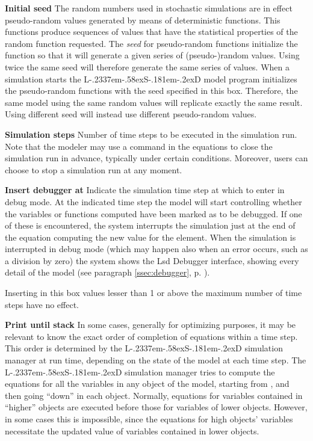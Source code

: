 \documentclass [11pt,a4paper] {book}
\def\LsD{{L\kern-.2337em\lower-.58ex\hbox{S}\kern-.181em\lower-.2ex\hbox{D}}\xspace}
\begin{document}
\textbf{Initial seed} 
The random numbers used in stochastic simulations are in effect pseudo-random values generated by means of deterministic functions. This functions produce sequences of values that have the statistical properties of the random function requested. The \textit{seed} for pseudo-random functions initialize the function so that it will generate a given series of (pseudo-)random values. Using twice the same seed will therefore generate the same series of values. When a simulation starts the \LsD model program initializes the pseudo-random functions with the seed specified in this box. Therefore, the same model using the same random values will replicate exactly the same result. Using different seed will instead use different pseudo-random values.

\bigskip

\textbf{Simulation steps} 
Number of time steps to be executed in the simulation run. Note that the modeler may use a command in the equations to close the simulation run in advance, typically under certain conditions. Moreover, users can choose to stop a simulation run at any moment.

\bigskip


\textbf{Insert debugger at} 
Indicate the simulation time step at which to enter in debug mode. At the indicated time step the model will start controlling whether the variables or functions computed have been marked as to be debugged. If one of these is encountered, the system interrupts the simulation just at the end of the equation computing the new value for the element. When the simulation is interrupted in debug mode (which may happen also when an error occurs, such as a division by zero) the system shows the Lsd Debugger interface, showing every detail of the model (see paragraph \ref{ssec:debugger}, p. \pageref{ssec:debugger}).

Inserting in this box values lesser than 1 or above the maximum number of time steps have no effect.


\bigskip

\textbf{Print until stack} 
In some cases, generally for optimizing purposes, it may be relevant to know the exact order of completion of equations within a time step. This order is determined by the \LsD simulation manager at run time, depending on the state of the model at each time step. The \LsD simulation manager tries to compute the equations for all the variables in any object of the model, starting from , and then going ``down'' in each object. Normally, equations for variables contained in ``higher'' objects are executed before those for variables of lower objects. However, in some cases this is impossible, since the equations for high objects' variables necessitate the updated value of variables contained in lower objects. 
\end{document}
